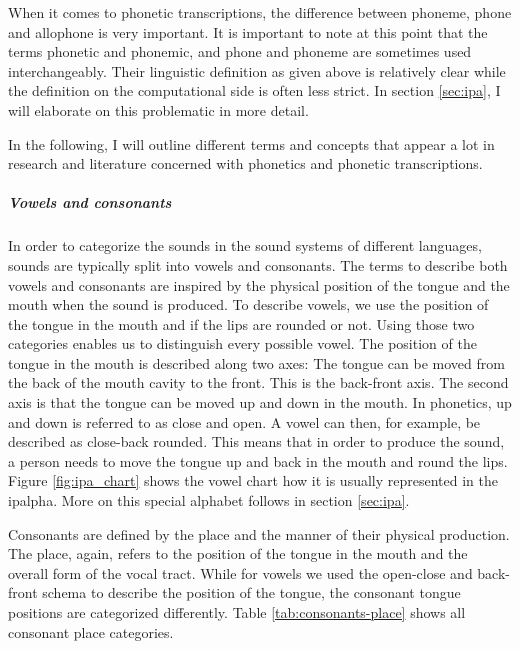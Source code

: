 When it comes to phonetic transcriptions, the difference between phoneme, phone and allophone is very important. It is important to note at this point that the terms phonetic and phonemic, and phone and phoneme are sometimes used interchangeably. Their linguistic definition as given above is relatively clear while the definition on the computational side is often less strict. In section \ref{sec:ipa}, I will elaborate on this problematic in more detail. 

In the following, I will outline different terms and concepts that appear a lot in research and literature concerned with phonetics and phonetic transcriptions.

\subparagraph{Vowels and consonants} In order to categorize the sounds in the sound systems of different languages, sounds are typically split into vowels and consonants. The terms to describe both vowels and consonants are inspired by the physical position of the tongue and the mouth when the sound is produced. To describe vowels, we use the position of the tongue in the mouth and if the lips are rounded or not. Using those two categories enables us to distinguish every possible vowel. The position of the tongue in the mouth is described along two axes: The tongue can be moved from the back of the mouth cavity to the front. This is the back-front axis. The second axis is that the tongue can be moved up and down in the mouth. In phonetics, up and down is referred to as close and open. A vowel can then, for example, be described as close-back rounded. This means that in order to produce the sound, a person needs to move the tongue up and back in the mouth and round the lips. Figure \ref{fig:ipa_chart} shows the vowel chart how it is usually represented in the \ac{ipalpha}. More on this special alphabet follows in section \ref{sec:ipa}. 

Consonants are defined by the place and the manner of their physical production. The place, again, refers to the position of the tongue in the mouth and the overall form of the vocal tract. While for vowels we used the open-close and back-front schema to describe the position of the tongue, the consonant tongue positions are categorized differently. Table \ref{tab:consonants-place} shows all consonant place categories.



